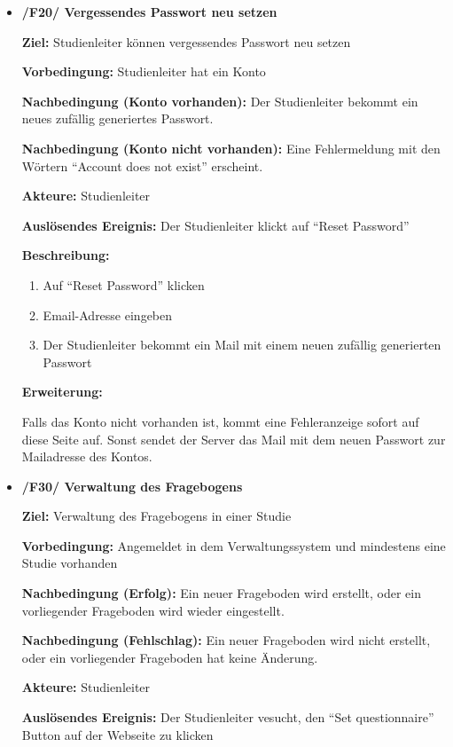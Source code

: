 \documentclass[a4paper]{scrreprt}
\begin{document}
\begin{itemize}
                \item \textbf{/F20/ Vergessendes Passwort neu setzen}

                \par \textbf{Ziel: }\gls{Studienleiter} können vergessendes Passwort neu setzen
                \par \textbf{Vorbedingung: }\gls{Studienleiter} hat ein Konto
                \par \textbf{Nachbedingung (Konto vorhanden): }Der \gls{Studienleiter} bekommt ein neues zufällig generiertes Passwort.
                \par \textbf{Nachbedingung (Konto nicht vorhanden): }Eine Fehlermeldung mit den Wörtern ``Account does not exist'' erscheint.
                \par \textbf{Akteure: }\gls{Studienleiter}
                \par \textbf{Auslösendes Ereignis: }Der \gls{Studienleiter} klickt auf ``Reset Password''
                \par \textbf{Beschreibung: }
                \begin{enumerate}
                    \item Auf ``Reset Password'' klicken
                    \item Email-Adresse eingeben
                    \item Der \gls{Studienleiter} bekommt ein Mail mit einem neuen zufällig generierten Passwort
                \end{enumerate}
                \par \textbf{Erweiterung: }
                    \par Falls das Konto nicht vorhanden ist, kommt eine Fehleranzeige sofort auf diese Seite auf. Sonst sendet der Server das Mail mit dem neuen Passwort zur Mailadresse des Kontos.


                \item \textbf{/F30/ Verwaltung des Fragebogens}

                \par \textbf{Ziel: }Verwaltung des Fragebogens in einer Studie
                \par \textbf{Vorbedingung: }Angemeldet in dem Verwaltungssystem und mindestens eine Studie vorhanden
                \par \textbf{Nachbedingung (Erfolg): }Ein neuer Frageboden wird erstellt, oder ein vorliegender Frageboden wird wieder eingestellt.
                \par \textbf{Nachbedingung (Fehlschlag): }Ein neuer Frageboden wird nicht erstellt, oder ein vorliegender Frageboden hat keine Änderung.
                \par \textbf{Akteure: }\gls{Studienleiter}
                \par \textbf{Auslösendes Ereignis: }Der \gls{Studienleiter} vesucht, den ``Set questionnaire'' Button auf der Webseite zu klicken


\end{itemize}
\end{document}
